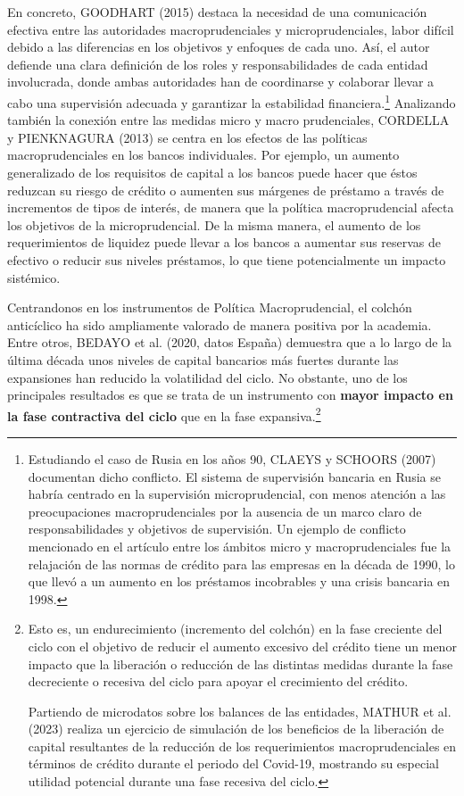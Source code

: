 \documentclass[10pt,a4paper]{article}
\begin{document}
En concreto, GOODHART (2015) destaca la necesidad de una comunicación efectiva entre las autoridades macroprudenciales y microprudenciales, labor difícil debido a las diferencias en los objetivos y enfoques de cada uno. Así, el autor defiende una clara definición de los roles y responsabilidades de cada entidad involucrada, donde ambas autoridades han de coordinarse y colaborar llevar a cabo una supervisión adecuada y garantizar la estabilidad financiera.\footnote{%
    Estudiando el caso de Rusia en los años 90, CLAEYS y SCHOORS (2007) documentan dicho conflicto. El sistema de supervisión bancaria en Rusia se habría centrado en la supervisión microprudencial, con menos atención a las preocupaciones macroprudenciales por la ausencia de un marco claro de responsabilidades y objetivos de supervisión. Un ejemplo de conflicto mencionado en el artículo entre los ámbitos micro y macroprudenciales fue la relajación de las normas de crédito para las empresas en la década de 1990, lo que llevó a un aumento en los préstamos incobrables y una crisis bancaria en 1998.
} Analizando también la conexión entre las medidas micro y macro prudenciales, CORDELLA y  PIENKNAGURA (2013) se centra en los efectos de las políticas macroprudenciales en los bancos individuales. Por ejemplo, un aumento generalizado de los requisitos de capital a los bancos puede hacer que éstos reduzcan su riesgo de crédito o aumenten sus márgenes de préstamo a través de incrementos de tipos de interés, de manera que la política macroprudencial afecta los objetivos de la microprudencial. De la misma manera, el aumento de los requerimientos de liquidez puede llevar a los bancos a aumentar sus reservas de efectivo o reducir sus niveles préstamos, lo que tiene potencialmente un impacto sistémico.

Centrandonos en los instrumentos de Política Macroprudencial, el colchón anticíclico ha sido ampliamente valorado de manera positiva por la academia. Entre otros, BEDAYO et al. (2020, datos España) demuestra que a lo largo de la última década unos niveles de capital bancarios más fuertes durante las expansiones han reducido la volatilidad del ciclo. No obstante, uno de los principales resultados es que se trata de un instrumento con \textbf{mayor impacto en la fase contractiva del ciclo} que en la fase expansiva.\footnote{%
    Esto es, un endurecimiento (incremento del colchón) en la fase creciente del ciclo con el objetivo de reducir el aumento excesivo del crédito tiene un menor impacto que la liberación o reducción de las distintas medidas durante la fase decreciente o recesiva del ciclo para apoyar el crecimiento del crédito.

Partiendo de microdatos sobre los balances de las entidades, MATHUR et al. (2023) realiza un ejercicio de simulación de los beneficios de la liberación de capital resultantes de la reducción de los requerimientos macroprudenciales en términos de crédito durante el periodo del Covid-19, mostrando su especial utilidad potencial durante una fase recesiva del ciclo.
} 
\end{document}
